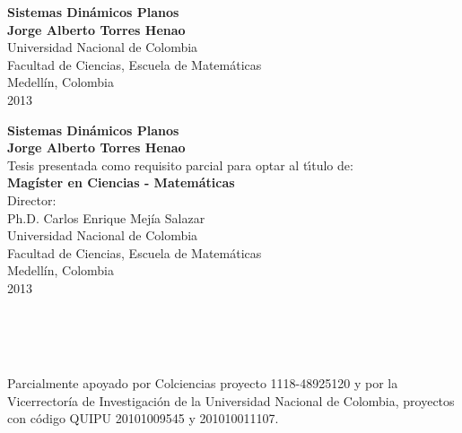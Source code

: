\begin{center}
\begin{figure}
\centering
{}
\end{figure}
\thispagestyle{empty} \vspace*{2.0cm} \textbf{\huge
Sistemas Dinámicos Planos}\\[6.0cm]
\Large\textbf{Jorge Alberto Torres Henao}\\[6.0cm]
\small Universidad Nacional de Colombia\\
Facultad de Ciencias, Escuela de Matemáticas\\
Medellín, Colombia\\
2013\\
\end{center}

\newpage{\pagestyle{empty}\cleardoublepage}

\newpage
\begin{center}
\thispagestyle{empty} \vspace*{0cm} \textbf{\huge
Sistemas Dinámicos Planos}\\[3.0cm]
\Large\textbf{Jorge Alberto Torres Henao}\\[3.0cm]
\small Tesis presentada como requisito parcial para optar al
t\'{\i}tulo de:\\
\textbf{Magíster en Ciencias - Matemáticas}\\[2.5cm]
Director:\\
Ph.D. Carlos Enrique Mejía Salazar\\[4.5cm]
Universidad Nacional de Colombia\\
Facultad de Ciencias, Escuela de Matemáticas\\
Medellín, Colombia\\
2013\\
\end{center}

\newpage{\pagestyle{empty}\cleardoublepage}

\thispagestyle{empty} \textbf{}\normalsize
\\\\\\%

\null
\vfill
\begin{flushright}
\begin{minipage}{10.5cm}
    \noindent
    {\small
Parcialmente apoyado por Colciencias proyecto 1118-48925120 y por la Vicerrectoría de Investigación de la Universidad Nacional de Colombia, proyectos con código QUIPU 20101009545 y 201010011107.		
	}
\end{minipage}
\end{flushright}

